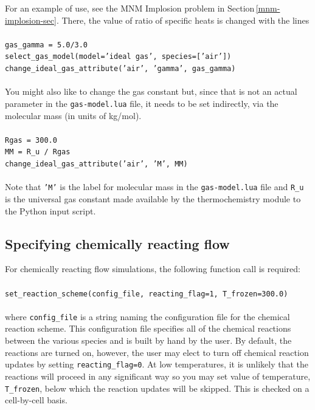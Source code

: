 \medskip
For an example of use, see the MNM Implosion problem in Section\,\ref{mnm-implosion-sec}.
There, the value of ratio of specific heats is changed with the lines\\
%
\topbar\\
\texttt{gas\_gamma = 5.0/3.0}\\
\texttt{select\_gas\_model(model='ideal gas', species=['air'])}\\
\texttt{change\_ideal\_gas\_attribute('air', 'gamma', gas\_gamma)\\}
\bottombar\\
You might also like to change the gas constant but, since that is not an actual parameter in the 
\texttt{gas-model.lua} file, it needs to be set indirectly, via the molecular mass (in units of kg/mol).\\
\topbar\\
\texttt{Rgas = 300.0}\\
\texttt{MM = R\_u / Rgas}\\
\texttt{change\_ideal\_gas\_attribute('air', 'M', MM)\\}
\bottombar\\
Note that \texttt{'M'} is the label for molecular mass in the \texttt{gas-model.lua} file
and \texttt{R\_u} is the universal gas constant made available by the thermochemistry module
to the Python input script.


\subsection{Specifying chemically reacting flow}
For chemically reacting flow simulations, the following function call is
required:\\
%
\topbar\\
\texttt{set\_reaction\_scheme(config\_file, reacting\_flag=1, T\_frozen=300.0)}\\
\bottombar\\
where \texttt{config\_file} is a string naming the configuration file for the
chemical reaction scheme.  This configuration file specifies all of the chemical
reactions between the various species and is built by hand by the user.
By default, the reactions are turned on, however, the user may elect to turn off
chemical reaction updates by setting \texttt{reacting\_flag=0}.
At low temperatures, it is unlikely that the reactions will proceed in any significant way
so you may set value of temperature, \verb!T_frozen!, below which the reaction updates will
be skipped.
This is checked on a cell-by-cell basis.

